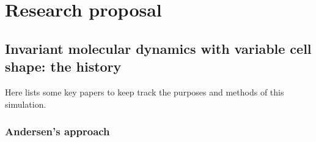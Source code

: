
\section{Research proposal}

\subsection{Invariant molecular dynamics with variable cell shape: the history}

Here lists some key papers to keep track the purposes and methods of this
simulation.


\subsubsection{Andersen's approach}


